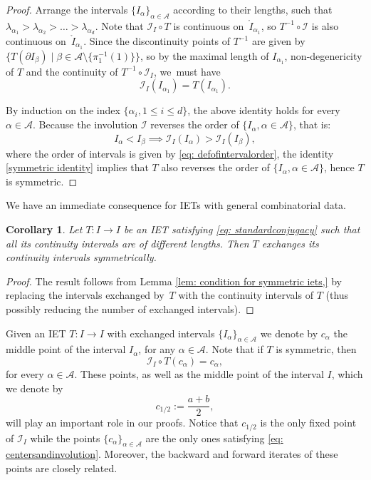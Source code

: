 \documentclass[JEP,XML,SOM,Unicode,NoEqCountersInSection,NoFloatCountersInSection,published]{cedram}
\theoremstyle{plain}
\newtheorem{corollary}[theorem]{Corollary}
\theoremstyle{definition}
\newcommand{\A}{\mathcal{A}}
\newcommand{\I}{\mathcal{I}}
\begin{document}
\begin{proof}
Arrange the intervals $\{I_{\alpha}\}_{\alpha\in \A}$ according to their lengths, such that $\lambda_{\alpha_1}>\lambda_{\alpha_2}>\dots> \lambda_{\alpha_d}$.
Note that $\I_I\circ T$ is continuous on~$\mathring I_{\alpha_1}$, so $T^{-1}\circ \I$ is also continuous on~$\mathring I_{\alpha_1}$. Since the discontinuity points of $T^{-1}$ are given by $\{T(\partial I_{\beta}) \mid \beta\in \A {\setminus \{\pi_1^{-1}(1)\}}\}$, so by the maximal length of $I_{\alpha_1}$, non-degenericity of $T$ and the continuity of $T^{-1}\circ \I_I$, we~must have
\begin{equation}\label{symmetric identity}
\I_I(I_{\alpha_1})=T(I_{\alpha_1}).
\end{equation}

By induction on the index $\{\alpha_i, 1\le i\le d\}$, the above identity holds for every $\alpha \in \A$. Because the involution $\I$ reverses the order of $\{I_{\alpha}, \alpha \in \A\}$, that is:
\[
I_{\alpha}<I_{\beta}\implies \I_I(I_{\alpha})>\I_I(I_{\beta}),
\]
{where the order of intervals is given by \eqref{eq: defofintervalorder}, }the identity \eqref{symmetric identity} implies that $T$ also reverses the order of $\{I_{\alpha}, \alpha \in \A\}$, hence $T$ is symmetric.
\end{proof}
We have an immediate consequence for IETs with general combinatorial data.
\begin{corollary}\label{cor: symmetricintcont}
Let $T: I \to I$ be an IET satisfying \eqref{eq: standardconjugacy} such that all its continuity intervals are of different lengths. Then $T$ exchanges its continuity intervals symmetrically.
\end{corollary}

\begin{proof}
The result follows from Lemma \ref{lem: condition for symmetric iets,} by replacing the intervals exchanged by~$T$ with the continuity intervals of $T$ (thus possibly reducing the number of exchanged intervals).
\end{proof}

Given an IET $T: I \to I$ with exchanged intervals $\{I_{\alpha}\}_{\alpha \in \A}$ we denote by $c_{\alpha}$ the middle point of the interval $I_\alpha$, for any $\alpha\in\A$. Note that if $T$ is symmetric, then\vspace*{-3pt}
\begin{equation}\label{eq: centersandinvolution}
\mathcal{I}_I\circ T(c_{\alpha})=c_{\alpha},
\end{equation}
for every $\alpha\in\A$. These points, as well as the middle point of the interval $I$, which we denote by\vspace*{-3pt}
\[
c_{1/2} := \frac{a + b}{2},
\]
will play an important role in our proofs. Notice that $c_{1/2}$ is the only fixed point of $\I_I$ while the points $\{c_{\alpha}\}_{\alpha\in\A}$ are the only ones satisfying
\eqref{eq: centersandinvolution}. Moreover, the backward and forward
iterates of these points are closely related.
\end{document}
